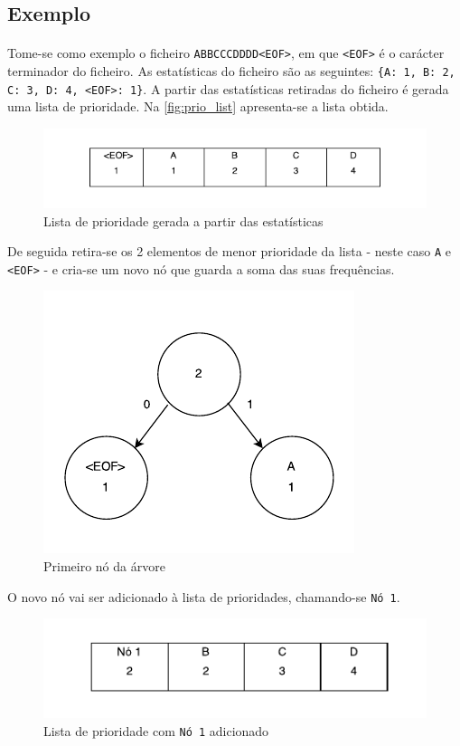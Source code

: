 \subsection*{Exemplo}

\paragraph{} Tome-se como exemplo o ficheiro \texttt{ABBCCCDDDD<EOF>}, em que \texttt{<EOF>} é o carácter terminador do ficheiro. As estatísticas do ficheiro são as seguintes: \texttt{\{A: 1, B: 2, C: 3, D: 4, <EOF>: 1\}}. A partir das estatísticas retiradas do ficheiro é gerada uma lista de prioridade. Na \autoref{fig:prio_list} apresenta-se a lista obtida.

\begin{figure}[H]
  \centering
  \includegraphics[width=.65\textwidth]{img/prio_list}
  \caption{Lista de prioridade gerada a partir das estatísticas}
  \label{fig:prio_list}
\end{figure}

De seguida retira-se os 2 elementos de menor prioridade da lista - neste caso \texttt{A} e \texttt{<EOF>} - e cria-se um novo nó que guarda a soma das suas frequências.

\begin{figure}[H]
  \centering
  \includegraphics[width=.5\textwidth]{img/trie_1}
  \caption{Primeiro nó da árvore}
  \label{fig:trie_1}
\end{figure}

O novo nó vai ser adicionado à lista de prioridades, chamando-se \texttt{Nó 1}.

\begin{figure}[H]
  \centering
  \includegraphics[width=.65\textwidth]{img/prio_list_2}
  \caption{Lista de prioridade com \texttt{Nó 1} adicionado}
  \label{fig:prio_list_2}
\end{figure}

